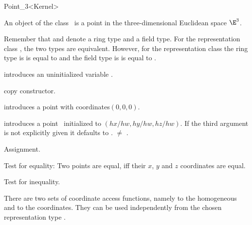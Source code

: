 \begin{ccRefClass} {Point_3<Kernel>}

\ccDefinition
An object of the class \ccRefName\ is a point in the three-dimensional
Euclidean space $\E^3$. 

Remember that  and  denote a ring type 
and a field type.
For the representation class , the two types are 
equivalent.
However, for the representation class  the ring 
type is  is equal to  and the field type is 
 is equal to .


\ccCreation
{}


\ccHidden {}
             {introduces an uninitialized variable \ccVar.}

\ccHidden {}
 	    {copy constructor.}

 	    {introduces a point with  coordinates$(0,0,0)$.}

            {introduces a point \ccVar\ initialized to $(hx/hw,hy/hw, hz/hw)$.
             If the third argument is not explicitly given it defaults
             to .
	     \ccPrecond {} $\neq$ .}


\ccOperations

\ccHidden {}
        {Assignment.}

       {Test for equality: Two points are equal, iff their $x$, $y$ and $z$
        coordinates are equal.}

       {Test for inequality.}



There are two sets of coordinate access functions, namely to the
homogeneous and to the  coordinates. They can be used
independently from the chosen representation type .


\end{ccRefClass}
